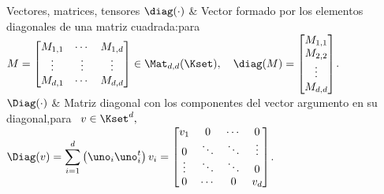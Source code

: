 \begin{notation}{Vectores, matrices, tensores}
\hline
%
$\diag(\cdot)$  & Vector  formado  por  los elementos  diagonales  de una  matriz
cuadrada:\vspace{1mm}\newline para
 \ $\displaystyle M = \protect\begin{bmatrix}
  M_{1,1}  & \cdots & M_{1,d} \\
  \vdots  & \vdots & \vdots \\
  M_{d,1} & \cdots & M_{d,d}
\end{bmatrix}\protect
 \in \Mat_{d,d}(\Kset), \quad \diag(M) =
 \protect\begin{bmatrix} M_{1,1} \\M_{2,2} \\ \vdots \\ M_{d,d}
\end{bmatrix}\protect
$.\vspace{1mm}\\[2.5mm]
%
\hline
%
$\Diag(\cdot)$ & Matriz diagonal  con los componentes del vector argumento en su
diagonal,\vspace{1mm}\newline para \ $\displaystyle v \in \Kset^d,$\vspace{1mm}\newline
$\displaystyle \Diag(v) = \sum_{i=1}^d \left( \uno_i \uno_i^t \right) v_i =
\protect\begin{bmatrix}
  v_1  &   0    & \cdots &    0   \\[-.25mm]
   0   & \ddots & \ddots & \vdots \\[-1mm]
\vdots & \ddots & \ddots &    0   \\[-.25mm]
   0   & \cdots &    0   &   v_d
\end{bmatrix}\protect$.\vspace{1mm}\\[2.5mm]
%

\end{notation}
